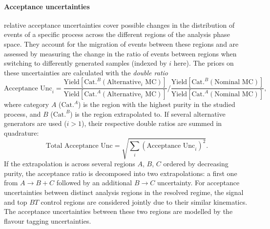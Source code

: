 \paragraph{Acceptance uncertainties} relative acceptance uncertainties cover possible changes in the distribution of events of a specific process across the different regions of the analysis phase space. They account for the migration of events between these regions and are assessed by measuring the change in the ratio of events between regions when switching to differently generated samples (indexed by $i$ here). The priors on these uncertainties are calculated with the \textit{double ratio} 
\begin{equation}\label{eq-doubleRatio}
    \text{Acceptance Unc}_i = \frac{\text{Yield}[\text{Cat.}^B (\mathrm{Alternative}_i\mathrm{\,\,MC})]}{\text{Yield}[\text{Cat.}^A (\mathrm{Alternative}_i\mathrm{\,\,MC})]} \Bigg/ \frac{\text{Yield}[\text{Cat.}^B (\mathrm{Nominal\,\,MC})]}{\text{Yield}[\text{Cat.}^A (\mathrm{Nominal\,\,MC})]},
\end{equation}
where category $A$ ($\text{Cat.}^A$) is the region with the highest purity in the studied process, and $B$ ($\text{Cat.}^B$) is the region extrapolated to. If several alternative generators are used ($i > 1$), their respective double ratios are summed in quadrature: \[ \text{Total Acceptance Unc} = \sqrt{\sum_i\left(\text{Acceptance Unc}_i\right)^2}.\] If the extrapolation is across several regions $A$, $B$, $C$ ordered by decreasing purity, the acceptance ratio is decomposed into two extrapolations: a first one from $A \rightarrow B+C$ followed by an additional $B \rightarrow C$ uncertainty. For acceptance uncertainties between distinct analysis regions in the resolved regime, the signal and top $BT$ control regions are considered jointly due to their similar kinematics. The acceptance uncertainties between these two regions are modelled by the flavour tagging uncertainties.

